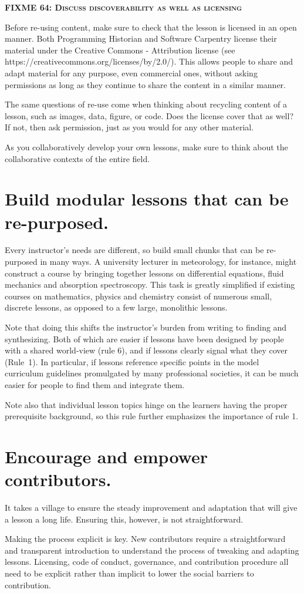 \documentclass[10pt,letterpaper]{article}
\newcommand{\fixme}[2]{\textsc{\textbf{FIXME {#1}: {#2}}}}
\newcommand{\rulemajor}[1]{\section{#1}}
\begin{document}
\fixme{64}{Discuss discoverability as well as licensing}

Before re-using content,
make sure to check that the lesson is licensed in an open manner.
Both Programming Historian and Software Carpentry license their material under
the Creative Commons - Attribution license
(see https://creativecommons.org/licenses/by/2.0/).
This allows people to share and adapt material for any purpose,
even commercial ones,
without asking permissions as long as they continue to share the content in a similar manner.

The same questions of re-use come when thinking about recycling content of a lesson,
such as images, data, figure, or code.
Does the license cover that as well?
If not,
then ask permission,
just as you would for any other material.

As you collaboratively develop your own lessons,
make sure to think about the collaborative contexts of the entire field.

\rulemajor{Build modular lessons that can be re-purposed.}

Every instructor's needs are different,
so build small chunks that can be re-purposed in many ways.
A university lecturer in meteorology, for instance,
might construct a course by bringing together lessons on differential equations,
fluid mechanics and absorption spectroscopy.
This task is greatly simplified if existing courses on mathematics,
physics and chemistry consist of numerous small, discrete lessons,
as opposed to a few large, monolithic lessons.

Note that doing this shifts the instructor's burden from writing to finding and synthesizing.
Both of which are easier if lessons have been designed by people with a shared world-view (rule 6),
and if lessons clearly signal what they cover (Rule~1).
In particular,
if lessons reference specific points in the model curriculum guidelines promulgated by many professional societies,
it can be much easier for people to find them and integrate them.

Note also that individual lesson topics hinge on the learners having the proper prerequisite background,
so this rule further emphasizes the importance of rule 1.

\rulemajor{Encourage and empower contributors.}

It takes a village to ensure
the steady improvement and adaptation that will give a lesson a long life.
Ensuring this, however, is not straightforward.

Making the process explicit is key.
New contributors require a straightforward and transparent introduction
to understand the process of tweaking and adapting lessons.
Licensing, code of conduct, governance, and contribution procedure
all need to be explicit rather than implicit
to lower the social barriers to contribution.
\end{document}
